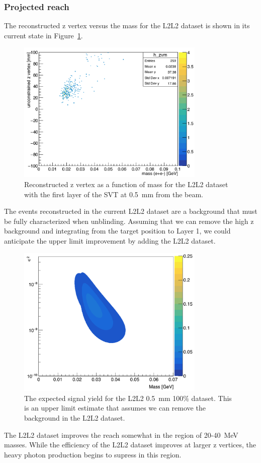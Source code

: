 \subsubsection{Projected reach}

The reconstructed z vertex versus the mass for the L2L2 dataset is shown in its current state in Figure~\ref{fig:zVm_L2L2_0p5}.

\begin{figure}[H]
  \centering
     \includegraphics[width=0.8\textwidth]{plots/zVm_L2L2.png}
  \caption{Reconstructed z vertex as a function of mass for the L2L2 dataset with the first layer of the SVT at 0.5~mm from the beam.}
  \label{fig:zVm_L2L2_0p5}
\end{figure} 

The events reconstructed in the current L2L2 dataset are a background that must be fully characterized when unblinding. Assuming that we can remove the high z background and integrating from the target position to Layer 1, we could anticipate the upper limit improvement by adding the L2L2 dataset. 

\begin{figure}[H]
  \centering
     \includegraphics[width=0.8\textwidth]{plots/reachL2L2.png}
  \caption{The expected signal yield for the L2L2 0.5~mm 100$\%$ dataset. This is an upper limit estimate that assumes we can remove the background in the L2L2 dataset. }
  \label{fig:reachL2L2}
\end{figure} 


The L2L2 dataset improves the reach somewhat in the region of 20-40~MeV masses. While the efficiency of the L2L2 dataset improves at larger z vertices, the heavy photon production begins to supress in this region. 

